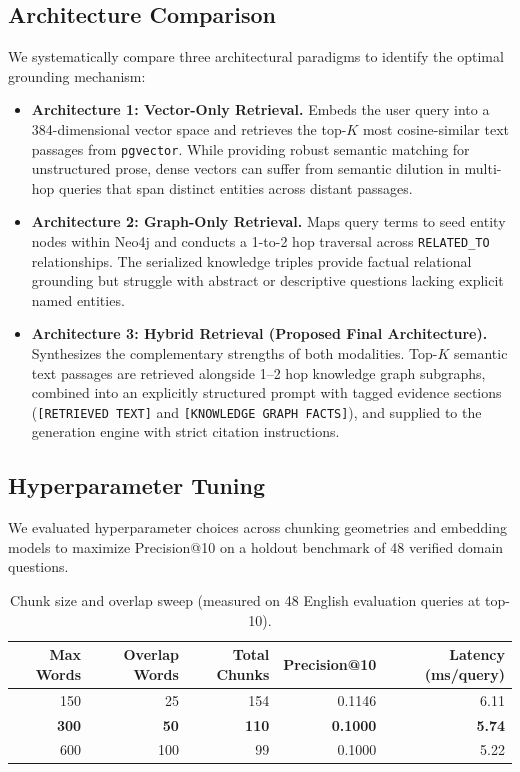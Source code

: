 \documentclass[11pt,a4paper]{article}
\begin{document}
\subsection{Architecture Comparison}
We systematically compare three architectural paradigms to identify the optimal grounding mechanism:
\begin{itemize}[leftmargin=*]
  \item \textbf{Architecture 1: Vector-Only Retrieval.} Embeds the user query into a 384-dimensional vector space and retrieves the top-$K$ most cosine-similar text passages from \texttt{pgvector}. While providing robust semantic matching for unstructured prose, dense vectors can suffer from semantic dilution in multi-hop queries that span distinct entities across distant passages.
  \item \textbf{Architecture 2: Graph-Only Retrieval.} Maps query terms to seed entity nodes within Neo4j and conducts a 1-to-2 hop traversal across \texttt{RELATED\_TO} relationships. The serialized knowledge triples provide factual relational grounding but struggle with abstract or descriptive questions lacking explicit named entities.
  \item \textbf{Architecture 3: Hybrid Retrieval (Proposed Final Architecture).} Synthesizes the complementary strengths of both modalities. Top-$K$ semantic text passages are retrieved alongside 1--2 hop knowledge graph subgraphs, combined into an explicitly structured prompt with tagged evidence sections (\texttt{[RETRIEVED TEXT]} and \texttt{[KNOWLEDGE GRAPH FACTS]}), and supplied to the generation engine with strict citation instructions.
\end{itemize}

\subsection{Hyperparameter Tuning}
We evaluated hyperparameter choices across chunking geometries and embedding models to maximize Precision@10 on a holdout benchmark of 48 verified domain questions.

\begin{table}[H]
\centering
\caption{Chunk size and overlap sweep (measured on 48 English evaluation queries at top-10).}
\begin{tabular}{rrrrr}
\toprule
\textbf{Max Words} & \textbf{Overlap Words} & \textbf{Total Chunks} & \textbf{Precision@10} & \textbf{Latency (ms/query)} \\
\midrule
150 & 25 & 154 & 0.1146 & 6.11 \\
\textbf{300} & \textbf{50} & \textbf{110} & \textbf{0.1000} & \textbf{5.74} \\
600 & 100 & 99 & 0.1000 & 5.22 \\
\bottomrule
\end{tabular}
\end{table}
\end{document}
